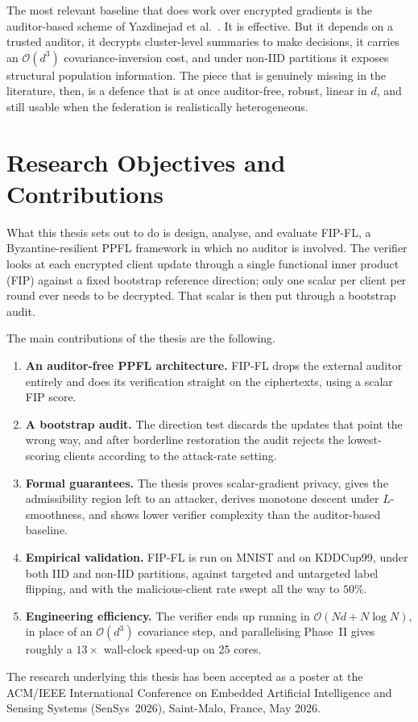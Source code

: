The most relevant baseline that does work over encrypted gradients is the auditor-based scheme of Yazdinejad et al.~\cite{yazdinejad2024robust}. It is effective. But it depends on a trusted auditor, it decrypts cluster-level summaries to make decisions, it carries an $\mathcal{O}(d^3)$ covariance-inversion cost, and under non-IID partitions it exposes structural population information. The piece that is genuinely missing in the literature, then, is a defence that is at once auditor-free, robust, linear in $d$, and still usable when the federation is realistically heterogeneous.

\section{Research Objectives and Contributions}

What this thesis sets out to do is design, analyse, and evaluate FIP-FL, a Byzantine-resilient PPFL framework in which no auditor is involved. The verifier looks at each encrypted client update through a single functional inner product (FIP) against a fixed bootstrap reference direction; only one scalar per client per round ever needs to be decrypted. That scalar is then put through a bootstrap audit.

The main contributions of the thesis are the following.
\begin{enumerate}
    \item \textbf{An auditor-free PPFL architecture.} FIP-FL drops the external auditor entirely and does its verification straight on the ciphertexts, using a scalar FIP score.
    \item \textbf{A bootstrap audit.} The direction test discards the updates that point the wrong way, and after borderline restoration the audit rejects the lowest-scoring clients according to the attack-rate setting.
    \item \textbf{Formal guarantees.} The thesis proves scalar-gradient privacy, gives the admissibility region left to an attacker, derives monotone descent under $L$-smoothness, and shows lower verifier complexity than the auditor-based baseline.
    \item \textbf{Empirical validation.} FIP-FL is run on MNIST and on KDDCup99, under both IID and non-IID partitions, against targeted and untargeted label flipping, and with the malicious-client rate swept all the way to $50\%$.
    \item \textbf{Engineering efficiency.} The verifier ends up running in $\mathcal{O}(Nd+N\log N)$, in place of an $\mathcal{O}(d^3)$ covariance step, and parallelising Phase~II gives roughly a $13\times$ wall-clock speed-up on 25 cores.
\end{enumerate}

The research underlying this thesis has been accepted as a poster at the ACM/IEEE International Conference on Embedded Artificial Intelligence and Sensing Systems (SenSys~2026), Saint-Malo, France, May 2026.
